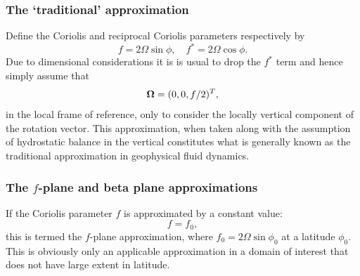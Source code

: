 \subsubsection{The `traditional' approximation}
Define the Coriolis and reciprocal Coriolis parameters \citep{cushman1994} respectively by
\begin{equation}\label{eq:coriolis_parameters} 
f=2\Omega\sin\phi,\quad f^*=2\Omega\cos\phi.
\end{equation}
Due to dimensional considerations it is is usual to
drop the $f^*$ term and hence simply assume that 
\begin{equation}\label{eq:f_omega}
{\mbox{\boldmath$\Omega$}}=(0,0,f/2)^T,
\end{equation}
in the local frame of reference, \ie only to consider the locally vertical
component of the rotation vector.
This approximation, when taken along with the assumption of hydrostatic balance in the
vertical constitutes what is generally known as the traditional approximation in geophysical fluid
dynamics.


\subsubsection{The $f$-plane and beta plane approximations}
If the Coriolis parameter $f$ is approximated by a constant value:
\begin{equation}\label{eq:f-plane}
f=f_0,
\end{equation}
this is termed the $f$-plane approximation, 
where $f_0 = 2\Omega\sin\phi_0$ at a latitude $\phi_0$.
This is obviously only an applicable approximation in a domain of interest 
that does not have large extent in latitude. 

